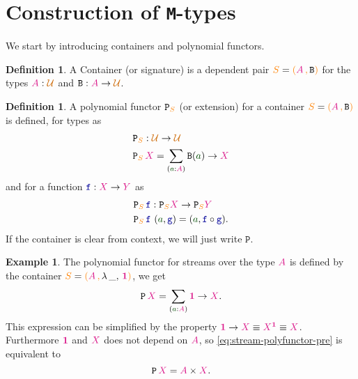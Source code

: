 \documentclass[twoside,11pt,openright]{report}
\theoremstyle{plain} %
\theoremstyle{definition}
\newtheorem{defn}[thm]{Definition}%
\newtheorem{exmp}{Example} %
\theoremstyle{remark}
\newcommand*{\term}[1]{\textcolor{green!30!black}{#1}} %
\newcommand*{\type}[1]{\textcolor{magenta!90!black}{#1}}
\newcommand*{\container}[1]{\textcolor{orange}{#1}}
\newcommand*{\containerpair}[2]{\ensuremath{\colorlet{savedleftcolor}{.}\color{orange}\left(\color{savedleftcolor}#1\,\textcolor{orange}{\mathbf{,}}\,#2\color{orange}\right)\color{savedleftcolor}}}
\newcommand*{\containerpairsimple}[2]{\containerpair{#1}{\lambda\,\_,\,#2}}
\newcommand*{\universe}[1]{\textcolor{orange!80!black}{#1}}
\newcommand*{\unit}{\type{\textbf{1}}}
\newcommand*{\function}[1]{\textcolor{blue!60!black}{\ensuremath{\mathtt{#1}}}}
\newcommand*{\typeformer}[1]{\ensuremath{\mathtt{#1}}}
\newcommand*{\functor}[1]{\ensuremath{\mathbf{\mathtt{#1}}}}
\begin{document}
\section{Construction of \texttt{M}-types}
We start by introducing containers and polynomial functors.
\begin{defn}
  A Container (or signature) is a dependent pair \(\container{S} = \containerpair{\type{A}}{\typeformer{B}}\) for the types \(\type{A} : \universe{\mathcal{U}}\) and \(\typeformer{B} : \type{A} \rightarrow \universe{\mathcal{U}}\). 
\end{defn}
\begin{defn}
  A polynomial functor \(\functor{P}_{\container{S}}\) (or extension) for a container \(\container{S} = \containerpair{\type{A}}{\typeformer{B}}\) is defined, for types as
  \begin{equation}
    \begin{aligned}
      &\functor{P}_{\container{S}} : \universe{\mathcal{U}} \rightarrow \universe{\mathcal{U}} \\
      &\functor{P}_{\container{S}}\,\type{X} = \sum_{(\term{a} : \type{A})} \typeformer{B}(\term{a}) \rightarrow \type{X}
    \end{aligned}
  \end{equation}
  and for a function \(\function{f} : \type{X} \rightarrow \type{Y}\) as
  \begin{equation}
    \begin{aligned}
      &\functor{P}_{\container{S}}\,\function{f} : \functor{P}_{\container{S}}\type{X} \rightarrow \functor{P}_{\container{S}}\type{Y} \\
      &\functor{P}_{\container{S}}\,\function{f}~(\term{a},\function{g}) = (\term{a}, \function{f} \circ \function{g}).
    \end{aligned}
  \end{equation}
  If the container is clear from context, we will just write \(\functor{P}\).
\end{defn}
\begin{exmp}
  \label{exmp:stream-polyfunctor-example}
  The polynomial functor for streams over the type \(\type{A}\) is defined by the container \(\container{S} = \containerpairsimple{\type{A}}{\unit}\), we get
  \begin{equation}
    \label{eq:stream-polyfunctor-pre}
    \functor{P}\,\type{X} = \sum_{(\term{a} : \type{A})} \unit \rightarrow \type{X}.
  \end{equation}
  This expression can be simplified by the property \(\unit \rightarrow \type{X} \equiv \type{X}^{\unit} \equiv \type{X}\). Furthermore \(\unit\) and \(\type{X}\) does not depend on \(\type{A}\), so \eqref{eq:stream-polyfunctor-pre} is equivalent to
  \begin{equation}
    \functor{P}\,\type{X} = \type{A} \times \type{X}.
  \end{equation}
\end{exmp}
\end{document}
